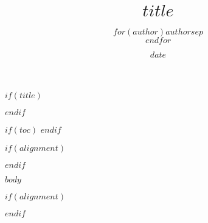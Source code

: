 \documentclass[$columns$,$fontsize$]{article}
\title{$title$}
\author{$for(author)$$author$$sep$\\$endfor$}
\date{$date$}
\begin{document}
$if(title)$
\maketitle
$endif$

$if(toc)$
\tableofcontents
$endif$


$if(alignment)$
\begin{$alignment$}
$endif$

$body$

$if(alignment)$
\end{$alignment$}
$endif$
\end{document}
